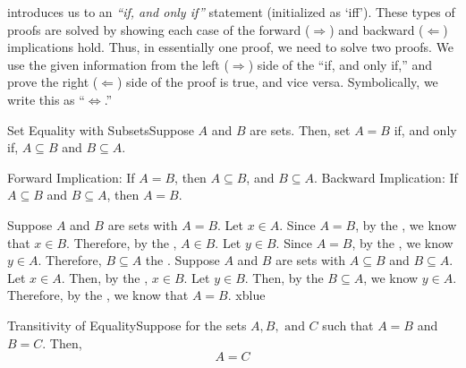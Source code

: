 \pfs


 introduces us to an \textit{``if, and only if''} statement (initialized as `iff'). These types of proofs are solved by showing each case of the forward (\(\Rightarrow\)) and backward (\(\Leftarrow\)) implications hold. Thus, in essentially one proof, we need to solve two proofs. We use the given information from the left (\(\Rightarrow\)) side of the ``if, and only if,'' and prove the right (\(\Leftarrow\)) side of the proof is true, and vice versa. Symbolically, we write this as ``\(\iff\).''

\vspace{0.5cm}

\begin{ntheorem}
    {Set Equality with Subsets}Suppose \(A\) and \(B\) are sets. Then, set \(A = B\) if, and only if, \(A\subseteq B\) and \(B\subseteq A\). 

    Forward Implication: If \(A = B\), then \(A\subseteq B\), and \(B\subseteq A\). 
    Backward Implication: If \(A \subseteq B\) and \(B\subseteq A\), then \(A = B\).
\end{ntheorem}

\iffpf
{Suppose \(A\) and \(B\) are sets with \(A = B\). Let \(x\in A\). Since \(A = B\), by the , we know that \(x\in B\). Therefore, by the , \(A\in B\). Let \(y\in B\). Since \(A = B\), by the , we know \(y\in A\). Therefore, \(B\subseteq A\) the .}
{Suppose \(A\) and \(B\) are sets with \(A\subseteq B\) and \(B\subseteq A\). Let \(x\in A\). Then, by the , \(x\in B\). Let \(y\in B\). Then, by the  \(B\subseteq A\), we know \(y\in A\).}
{Therefore, by the , we know that \(A = B\).}
{xblue}

\newpage

\begin{exercise}
    {Transitivity of Equality}Suppose for the sets \(A, B, \text{ and } C\) such that \(A = B\) and \(B = C\). Then, \[A = C\]
\end{exercise}

